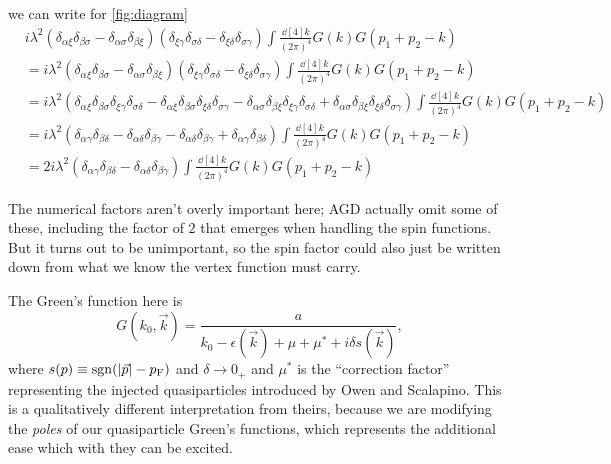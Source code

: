 \documentclass{article}
\newcommand{\pf}{p_{\mathrm{F}}}
\newcommand{\corr}{\mu^\ast}
\DeclareMathOperator{\sgn}{sgn}
\begin{document}
we can write for \cref{fig:diagram}
\begin{align}
	& i \lambda^2 \left( \delta_{\alpha\xi} \delta_{\beta\sigma} - \delta_{\alpha\sigma}\delta_{\beta\xi} \right)\left( \delta_{\xi\gamma} \delta_{\sigma\delta} - \delta_{\xi\delta}\delta_{\sigma\gamma} \right)\int \frac{\dd[4]{k}}{\left(2\pi\right)^4} G(k) G(p_1 + p_2 - k) \\
	&= i \lambda^2 \left( \delta_{\alpha\xi} \delta_{\beta\sigma} - \delta_{\alpha\sigma}\delta_{\beta\xi} \right)\left( \delta_{\xi\gamma} \delta_{\sigma\delta} - \delta_{\xi\delta}\delta_{\sigma\gamma} \right)\int \frac{\dd[4]{k}}{\left(2\pi\right)^4} G(k) G(p_1 + p_2 - k) \\
	&= i \lambda^2 \left( \delta_{\alpha\xi} \delta_{\beta\sigma} \delta_{\xi\gamma} \delta_{\sigma\delta} -  \delta_{\alpha\xi} \delta_{\beta\sigma} \delta_{\xi\delta}\delta_{\sigma\gamma} - \delta_{\alpha\sigma}\delta_{\beta\xi} \delta_{\xi\gamma} \delta_{\sigma\delta} + \delta_{\alpha\sigma}\delta_{\beta\xi}  \delta_{\xi\delta}\delta_{\sigma\gamma} \right)\int \frac{\dd[4]{k}}{\left(2\pi\right)^4} G(k) G(p_1 + p_2 - k) \\
	&= i \lambda^2 \left(\delta_{\alpha\gamma} \delta_{\beta\delta} -  \delta_{\alpha\delta} \delta_{\beta \gamma} - \delta_{\alpha\delta}\delta_{\beta\gamma}  + \delta_{\alpha\gamma}\delta_{\beta\delta} \right)\int \frac{\dd[4]{k}}{\left(2\pi\right)^4} G(k) G(p_1 + p_2 - k) \\
	&= 2 i \lambda^2 \left(\delta_{\alpha\gamma} \delta_{\beta\delta} -  \delta_{\alpha\delta} \delta_{\beta \gamma}\right)\int \frac{\dd[4]{k}}{\left(2\pi\right)^4} G(k) G(p_1 + p_2 - k)
\end{align}

The numerical factors aren't overly important here;
AGD actually omit some of these, including the factor of $2$ that emerges when handling the spin functions.
But it turns out to be unimportant, so the spin factor could also just be written down from what we know the vertex function must carry.

The Green's function here is
\begin{equation}
	G(k_0, \vec{k}) = \frac{a}{k_0 - \epsilon(\vec{k}) + \mu + \corr + i \delta s(\vec{k})},
\end{equation}
where $s(p) \equiv \sgn(\abs{\vec{p}} - \pf)$ and $\delta \rightarrow 0_{+}$ and $\corr$ is the ``correction factor'' representing the injected quasiparticles introduced by Owen and Scalapino.
This is a qualitatively different interpretation from theirs, because we are modifying the \emph{poles} of our quasiparticle Green's functions, which represents the additional ease which with they can be excited.
\end{document}
